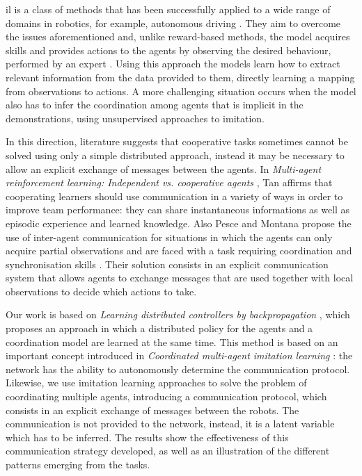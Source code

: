 \gls{il} is a class of methods that has been successfully applied to a wide range of 
domains in robotics, for example, autonomous driving 
\cite[][]{schaal1999imitation, stepputtis2019imitation}. They aim to overcome the 
issues aforementioned and, unlike reward-based methods, the model 
acquires skills and provides actions to the agents by observing the desired 
behaviour, performed by an expert \cite[][]{song2018multi, zhang2018deep, 
billard2008survey}.
Using this approach the models learn how to extract relevant information from 
the data provided to them, directly learning a mapping from observations to 
actions. 
A more challenging situation occurs when the model also has to infer the 
coordination among agents that is implicit in the demonstrations, using 
unsupervised approaches to imitation.

In this direction, literature suggests that cooperative tasks sometimes cannot be 
solved using only a simple distributed approach, instead it may be necessary to 
allow an explicit exchange of messages between the agents.
In \emph{Multi-agent reinforcement learning: Independent vs. cooperative 
agents} \cite[][]{tan1993multi}, Tan affirms that cooperating learners should use 
communication in a variety of ways in order to improve team performance: they 
can share instantaneous informations as well as episodic experience and learned 
knowledge.
Also Pesce and Montana propose the use of inter-agent communication for 
situations in which the agents can only acquire partial observations and are faced 
with a task requiring coordination and synchronisation skills 
\cite[][]{pesce2019improving}. Their solution consists in an explicit 
communication system that allows agents to exchange messages that are used 
together with local observations to decide which actions to take.

Our work is based on \emph{Learning distributed controllers by backpropagation}
\cite[][]{marcoverna2020}, which proposes an approach in which a distributed 
policy for the agents and a coordination model are learned at the same time. 
This method is based on an important concept introduced in \emph{Coordinated 
multi-agent imitation learning} \cite[][]{le2017coordinated}: the network has the 
ability to autonomously determine the communication protocol.
Likewise, we use imitation learning approaches to solve the problem of 
coordinating multiple agents, introducing a communication protocol, which 
consists in an explicit exchange of messages between the robots. The 
communication is not provided to the network, instead, it is a latent variable 
which has to be inferred.   
The results show the effectiveness of this communication strategy developed, as 
well as an illustration of the different patterns emerging from the tasks.
